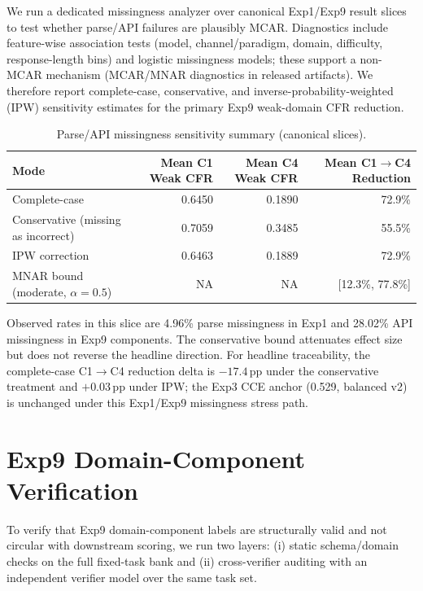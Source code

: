 \documentclass[10pt]{article}
\begin{document}
We run a dedicated missingness analyzer over canonical Exp1/Exp9 result slices to
test whether parse/API failures are plausibly MCAR. Diagnostics include feature-wise
association tests (model, channel/paradigm, domain, difficulty, response-length bins)
and logistic missingness models; these support a non-MCAR mechanism (MCAR/MNAR
diagnostics in released artifacts). We therefore report complete-case, conservative,
and inverse-probability-weighted (IPW) sensitivity estimates for the primary Exp9
weak-domain CFR reduction.

\begin{table}[h]
\centering
\caption{Parse/API missingness sensitivity summary (canonical slices).}
\label{tab:missingness}
\small
\begin{tabular}{lrrr}
\toprule
Mode & Mean C1 Weak CFR & Mean C4 Weak CFR & Mean C1$\rightarrow$C4 Reduction \\
\midrule
Complete-case & 0.6450 & 0.1890 & 72.9\% \\
Conservative (missing as incorrect) & 0.7059 & 0.3485 & 55.5\% \\
IPW correction & 0.6463 & 0.1889 & 72.9\% \\
MNAR bound (moderate, $\alpha=0.5$) & NA & NA & [12.3\%, 77.8\%] \\
\bottomrule
\end{tabular}
\end{table}

Observed rates in this slice are 4.96\% parse missingness in Exp1 and 28.02\%
API missingness in Exp9 components. The conservative bound attenuates effect size
but does not reverse the headline direction. For headline traceability, the
complete-case C1$\rightarrow$C4 reduction delta is $-17.4$\,pp under the
conservative treatment and $+0.03$\,pp under IPW; the Exp3 CCE anchor
(0.529, balanced v2) is unchanged under this Exp1/Exp9 missingness stress path.

\section{Exp9 Domain-Component Verification}
\label{app:exp9-mapping-validity}

To verify that Exp9 domain-component labels are structurally valid and not
circular with downstream scoring, we run two layers: (i) static schema/domain
checks on the full fixed-task bank and (ii) cross-verifier auditing with an
independent verifier model over the same task set.
\end{document}
